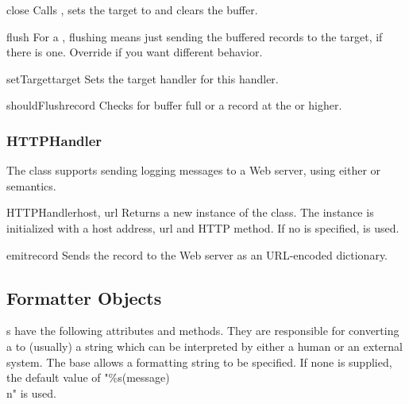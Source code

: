 \begin{methoddesc}{close}{}
Calls , sets the target to  and
clears the buffer.
\end{methoddesc}

\begin{methoddesc}{flush}{}
For a , flushing means just sending the buffered
records to the target, if there is one. Override if you want
different behavior.
\end{methoddesc}

\begin{methoddesc}{setTarget}{target}
Sets the target handler for this handler.
\end{methoddesc}

\begin{methoddesc}{shouldFlush}{record}
Checks for buffer full or a record at the  or higher.
\end{methoddesc}

\subsubsection{HTTPHandler}

The  class supports sending logging messages to a
Web server, using either  or  semantics.

\begin{classdesc}{HTTPHandler}{host, url}
Returns a new instance of the  class. The
instance is initialized with a host address, url and HTTP method.
If no  is specified,  is used.
\end{classdesc}

\begin{methoddesc}{emit}{record}
Sends the record to the Web server as an URL-encoded dictionary.
\end{methoddesc}

\subsection{Formatter Objects}

s have the following attributes and methods. They are
responsible for converting a  to (usually) a string
which can be interpreted by either a human or an external system. The
base
 allows a formatting string to be specified. If none is
supplied, the default value of "\%s(message)\\n" is used.


